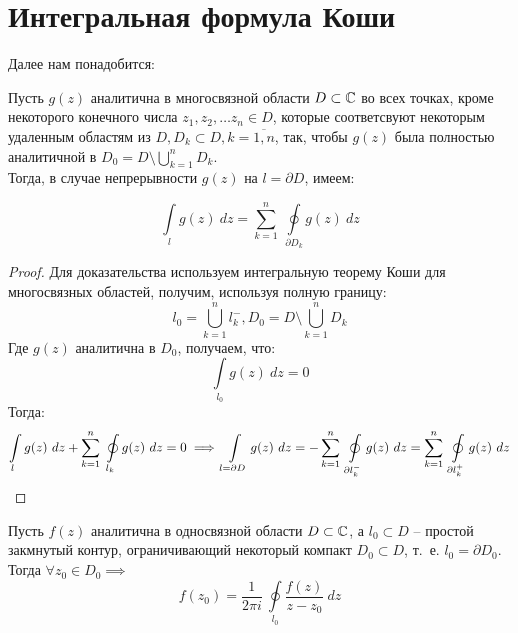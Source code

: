 \documentclass[../../main.tex]{subfiles}
\begin{document}
	\section{Интегральная формула Коши}
	Далее нам понадобится:
	\begin{lemma}
		Пусть $g(z)$ аналитична в многосвязной области $D \subset \mathbb{C}$ во всех точках, кроме некоторого конечного числа $z_1, z_2, \dots z_n \in D$, которые соответсвуют некоторым удаленным областям из $D, D_k \subset D, k = \overline{1,n}$, так, чтобы $g(z)$ была полностью аналитичной в $D_0 = D \setminus \bigcup \limits_{k=1}^{n} D_k$. \\
		Тогда, в случае непрерывности $g(z)$ на $l = \partial D$, имеем:
		
		\[\int \limits_{l} g(z) \ dz = \sum_{k=1}^{n} \ \oint \limits_{\partial D_k} g(z) \ dz  \]
	\end{lemma}	
	\begin{proof}
	Для доказательства используем интегральную теорему Коши для многосвязных областей, получим, используя полную границу:
	\[ l_0 = \bigcup \limits_{k=1}^{n} l^{-}_{k}, D_0 = D \setminus \bigcup \limits_{k=1}^{n} D_k \]
	Где $g(z)$ аналитична в $D_0$, получаем, что:
	\[ \int \limits_{l_0} g(z) \ dz = 0 \]
	Тогда:
	\[ \int \limits_{l} g(z) \ dz + \sum^{n}_{k=1} \ \oint \limits_{ l_k} g(z) \ dz = 0 \implies \int \limits_{l = \partial D} g(z) \ dz = - \sum_{k=1}^{n} \ \oint \limits_{\partial l_k^{-} } g(z) \ dz = \sum_{k=1}^{n} \ \oint \limits_{\partial l_k^{+} } g(z) \ dz \qedhere \]
	\end{proof}	
\begin{theorem}
	Пусть $f(z)$ аналитична в односвязной области $D \subset \mathbb{C}$, а $l_0 \subset D$ \--- простой закмнутый контур, ограничивающий некоторый компакт $D_0 \subset D$, т.~е. $l_0 = \partial D_0$. Тогда $\forall z_0\in D_0 \implies$
	\begin{equation}
	\label{32:3}
	f(z_0) = \frac{1}{2\pi i} \ \oint \limits_{l_0} \frac{f(z)}{z-z_0} \ dz
	\end{equation}
\end{theorem}
\end{document}
